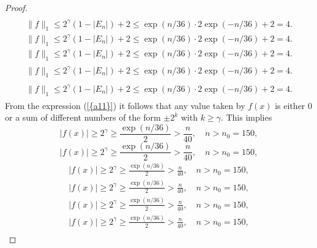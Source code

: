 \documentclass{amsart}
\numberwithin{equation}{section}
\begin{document}
\begin{proof}
{\begin{gather*}
\end{gather*}\fi  
{}\begin{gather}
\|f\|_1\le 2^\gamma(1-|E_n|)+2\le \exp(n/36)\cdot 2\exp(-n/36)+2=  4.
\end{gather}\fi   
{}\begin{multline*}
\|f\|_1\le 2^\gamma(1-|E_n|)+2\le \exp(n/36)\cdot 2\exp(-n/36)+2=  4.
\end{multline*}\fi  
{}\begin{multline}
\|f\|_1\le 2^\gamma(1-|E_n|)+2\le \exp(n/36)\cdot 2\exp(-n/36)+2=  4.
\end{multline}\fi  
{}\begin{multline*}\begin{split}
\|f\|_1\le 2^\gamma(1-|E_n|)+2\le \exp(n/36)\cdot 2\exp(-n/36)+2=  4.
\end{split}\end{multline*}\fi
{}\begin{multline}\begin{split}
\|f\|_1\le 2^\gamma(1-|E_n|)+2\le \exp(n/36)\cdot 2\exp(-n/36)+2=  4.
\end{split}\end{multline}\fi
}
From the expression {(\ref{{a11}})} it follows that any value taken by $f(x)$ is either $0$ or a sum of different numbers of the form
$\pm 2^k$ with $k\ge \gamma$. This implies
{
\begin{equation*} 
|f(x)|\ge 2^\gamma\ge \frac{\exp(n/36)}{2}>\frac{n}{40},\quad n>n_0=150,
 \end{equation*}\fi  
{}\begin{equation}
|f(x)|\ge 2^\gamma\ge \frac{\exp(n/36)}{2}>\frac{n}{40},\quad n>n_0=150,
\end{equation}\fi   
{}\begin{align*}
|f(x)|\ge 2^\gamma\ge \frac{\exp(n/36)}{2}>\frac{n}{40},\quad n>n_0=150,
\end{align*}\fi   
{}\begin{align}
|f(x)|\ge 2^\gamma\ge \frac{\exp(n/36)}{2}>\frac{n}{40},\quad n>n_0=150,
\end{align}\fi    
{}\begin{gather*}
|f(x)|\ge 2^\gamma\ge \frac{\exp(n/36)}{2}>\frac{n}{40},\quad n>n_0=150,
\end{gather*}\fi  
{}\begin{gather}
|f(x)|\ge 2^\gamma\ge \frac{\exp(n/36)}{2}>\frac{n}{40},\quad n>n_0=150,
\end{gather}\fi   
{}\begin{multline*}

\end{multline*}}
\end{proof}
\end{document}
